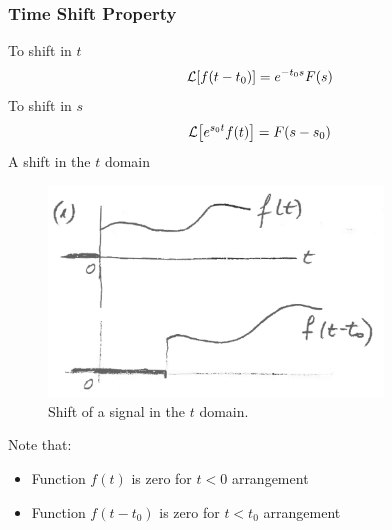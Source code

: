\documentclass[12pt,letter]{article}
\begin{document}
\subsubsection{Time Shift Property}
To shift in $t$
\begin{equation}
\mathcal{L}{\left[f(t-t_0)\right]} = e^{-t_0s}F(s)
\end{equation}
To shift in $s$
\begin{equation}
\mathcal{L}{\left[e^{s_0t}f(t)\right]} = F(s-s_0)
\end{equation}
A shift in the $t$ domain
		\begin{figure}[H]
			\centering
			\includegraphics[width=3.5in]{../figures/shift_properties}
			\caption{Shift of a signal in the $t$ domain.}
			\label{fig:shift_properties}
		\end{figure}
Note that:
\begin{itemize}[noitemsep, topsep=0pt]
\item Function $f(t)$ is zero for $t<0$ arrangement
\item Function $f(t-t_0)$ is zero for $t<t_0$ arrangement
\end{itemize}
\end{document}
